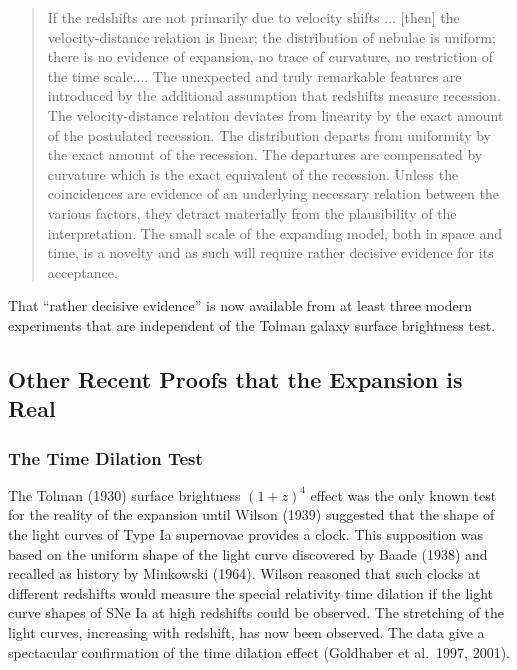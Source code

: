 \documentclass[preprint]{aastex}
\begin{document}
\begin{quote}

If the redshifts are not primarily due to velocity shifts ... [then]
the velocity-distance relation is linear; the distribution of nebulae
is uniform; there is no evidence of expansion, no trace of curvature,
no restriction of the time scale....  The unexpected and truly
remarkable features are introduced by the additional assumption that
redshifts measure recession. The velocity-distance relation deviates
from linearity by the exact amount of the postulated recession. The
distribution departs from uniformity by the exact amount of the
recession.  The departures are compensated by curvature which is the
exact equivalent of the recession. Unless the coincidences are
evidence of an underlying necessary relation between the various
factors, they detract materially from the plausibility of the
interpretation. The small scale of the expanding model, both in space
and time, is a novelty and as such will require rather decisive
evidence for its acceptance.

\end{quote}
   
\noindent That ``rather decisive evidence'' is now available from at
least three modern experiments that are independent of the Tolman
galaxy surface brightness test.

\subsection{Other Recent Proofs that the Expansion is Real}
              
\subsubsection{The Time Dilation Test}

The Tolman (1930) surface brightness $(1 + z)^4$ effect was the only
known test for the reality of the expansion until Wilson (1939)
suggested that the shape of the light curves of Type Ia supernovae
provides a clock. This supposition was based on the uniform shape of
the light curve discovered by Baade (1938) and recalled as history by
Minkowski (1964). Wilson reasoned that such clocks at different
redshifts would measure the special relativity time dilation if the
light curve shapes of SNe Ia at high redshifts could be observed. The
stretching of the light curves, increasing with redshift, has now been
observed. The data give a spectacular confirmation of the time
dilation effect (Goldhaber et al.\ 1997, 2001).
\end{document}
